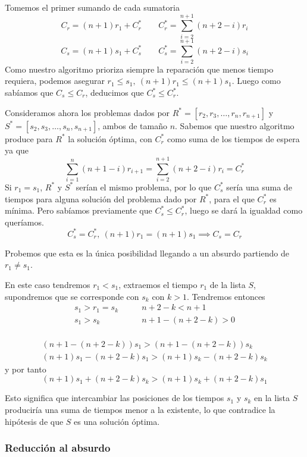 \documentclass[a4]{article}
\begin{document}
Tomemos el primer sumando de cada sumatoria
\[C_r = (n+1)r_1 + C_r^* \qquad C_r^* = \sum_{i=2}^{n+1}(n+2-i)r_i\]
\[C_s = (n+1)s_1 + C_s^* \qquad C_s^* = \sum_{i=2}^{n+1}(n+2-i)s_i\]
Como nuestro algoritmo prioriza siempre la reparación que menos tiempo
requiera, podemos asegurar $r_1 \leq s_1, \ (n+1)r_1 \leq
(n+1)s_1$. Luego como sabíamos que $C_s \leq C_r$, deducimos que
$C_s^* \leq C_r^*$.

Consideramos ahora los problemas dados por
$R^*=[r_2,r_3,\ldots,r_n,r_{n+1}]$ y
$S^*=[s_2,s_3,\ldots,s_n,s_{n+1}]$, ambos de tamaño $n$. Sabemos que
nuestro algoritmo produce para $R^*$ la solución óptima, con $C^*_r$
como suma de los tiempos de espera ya que
\[\sum_{i=1}^n(n+1-i)r_{i+1} = \sum_{i=2}^{n+1}(n+2-i)r_i = C^*_r\]
Si $r_1=s_1$, $R^*$ y $S^*$ serían el mismo problema, por lo que
$C_s^*$ sería una suma de tiempos para alguna solución del problema
dado por $R^*$, para el que $C_r^*$ es mínima. Pero sabíamos
previamente que $C_s^* \leq C_r^*$, luego se dará la igualdad como
queríamos.
\[C_s^* = C_r^*, \ (n+1)r_1=(n+1)s_1 \implies C_s = C_r\]

Probemos que esta es la única posibilidad llegando a un absurdo
partiendo de $r_1 \neq s_1$.

En este caso tendremos $r_1 < s_1$, extraemos el
tiempo $r_1$ de la lista $S$, supondremos que se corresponde con $s_k$
con $k > 1$. Tendremos entonces
\begin{align*}
  s_1 > r_1 = s_k& \qquad n+2-k < n+1 \\
  s_1 > s_k& \qquad n+1 - (n+2-k) > 0 \\
\end{align*}

\vspace{-15mm}

\begin{align*}    
  (n+1-(n+2-k))s_1 > (n+1-(n+2-k))s_k \\
  (n+1)s_1 - (n+2-k)s_1 > (n+1)s_k - (n+2-k)s_k
\end{align*}
y por tanto
\[(n+1)s_1 + (n+2-k)s_k > (n+1)s_k + (n+2-k)s_1\]

Esto significa que intercambiar las posiciones de los tiempos $s_1$ y
$s_k$ en la lista $S$ produciría una suma de tiempos menor a la
existente, lo que contradice la hipótesis de que $S$ es una solución
óptima.

\hfill\qedsymbol

\vspace{-5mm}

\subsubsection{Reducción al absurdo}
\end{document}
